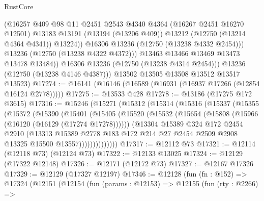 \begin{lexlean}{RustCore}
\begin{coremodule}
                    (@16257
                      @409
                      @98
                      @11
                      @2451
                      @2543
                      @4340
                      @4364
                      (@16267 @2451 @16270 @12501)
                      @13183
                      @13191
                      (@13194 (@13206 @409))
                      @13212
                      (@12750 (@13214 @4364 @4341))
                      @13224))
                  @16306
                  @13236
                  (@12750 (@13238 @4332 @2454)))
                @13236
                (@12750 (@13238 @4322 @4372)))
              @13463
              @13466
              @13469
              @13473
              @13478
              @13484))
          @16306
          @13236
          (@12750 (@13238 @4314 @2454)))
        @13236
        (@12750 (@13238 @4146 @4387)))
      @13502
      @13505
      @13508
      @13512
      @13517
      @13523)
@17274 := @16141 (@16146 (@16589 (@16931 (@16937 @17266 (@12854 @16124 @2778)))))
@17275 := @13533 @428
@17278 := @13186 (@17275 @172 @3615)
@17316 := @15246
    (@15271
      (@15312
        (@15314
          (@15316
            (@15337
              (@15355
                (@15372
                  (@15390
                    (@15401
                      (@15405
                        (@15520
                          (@15532
                            (@15654 (@15808 (@15966 (@16120 (@16129 (@17274 @17278))))))
                            (@13304
                              @15389
                              @324
                              @172
                              @2454
                              @2910
                              (@13313
                                @15389
                                @2778
                                @183
                                @172
                                @214
                                @27
                                @2454
                                @2509
                                @2908
                                @13325
                                @15500
                                @13557))))))))))))))
@17317 := @12112 @73
@17321 := @12114 (@12118 @73) (@12124 @73)
@17322 := @12133 @13025
@17324 := @12129 (@17322 @12148)
@17326 := @12171 (@12172 @73)
@17327 := @12167 @17326
@17329 := @12129 (@17327 @12197)
@17346 := @12128
    (fun (fn : @152) =>
    @17324
      (@12151
        (@12154
          (fun (params : @12153) =>
          @12155
            (fun (rty : @2266) =>

\end{coremodule}
\end{lexlean}
